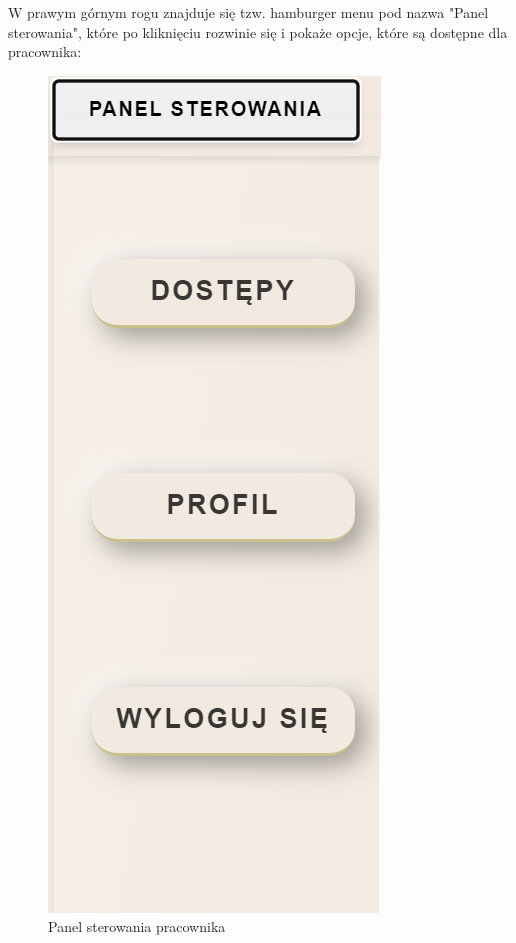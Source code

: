 \noindent W prawym górnym rogu znajduje się tzw. hamburger menu pod nazwa "Panel sterowania", które po kliknięciu
rozwinie się i pokaże opcje, które są dostępne dla pracownika:
\begin{figure}[h]
    \centering
    \includegraphics[scale=0.35]{photos/panel_sterowania_pracownika.png}
    \caption{Panel sterowania pracownika}
    \label{fig:login}
\end{figure}

\newpage

